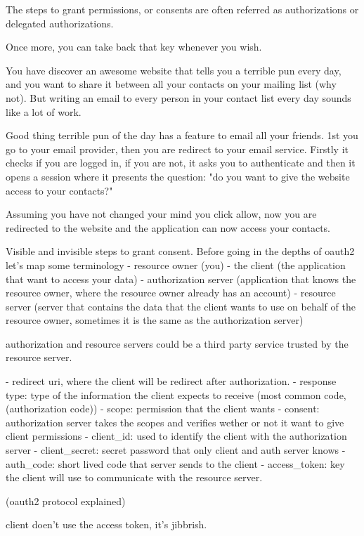 \documentclass{style}
\begin{document}
The steps to grant permissions, or consents are often referred as authorizations
or delegated authorizations.

Once more, you can take back that key whenever you wish.

You have discover an awesome website that tells you a terrible pun every day,
and you want to share it between all your contacts on your mailing list (why
not).
But writing an email to every person in your contact list every day sounds like
a lot of work.

Good thing terrible pun of the day has a feature to email all your friends.
1st you go to your email provider, then you are redirect to your email service.
Firstly it checks if you are logged in, if you are not, it asks you to
authenticate and then it opens a session where it presents the question: "do you
want to give the website access to your contacts?"

Assuming you have not changed your mind you click allow, now you are redirected
to the website and the application can now access your contacts.

Visible and invisible steps to grant consent.
Before going in the depths of oauth2 let's map some terminology
- resource owner (you)
- the client (the application that want to access your data)
- authorization server (application that knows the resource owner, where the
resource owner already has an account)
- resource server (server that contains the data that the client wants to use on
behalf of the resource owner, sometimes it is the same as the authorization
server)

authorization and resource servers could be a third party service trusted by the
resource server.

- redirect uri, where the client will be redirect after authorization.
- response type: type of the information the client expects to receive (most
common code, (authorization code))
- scope: permission that the client wants
- consent: authorization server takes the scopes and verifies wether or not it
want to give client permissions
- client\_id: used to identify the client with the authorization server
- client\_secret: secret password that only client and auth server knows
- auth\_code: short lived code that server sends to the client
- access\_token: key the client will use to communicate with the resource server.

(oauth2 protocol explained)

client doen't use the access token, it's jibbrish.
\end{document}
